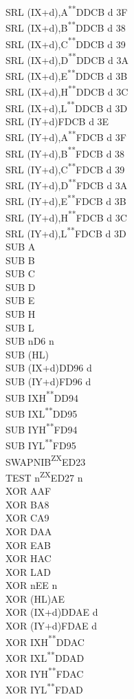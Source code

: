 \documentclass[12pt,twoside,openright,a4paper]{book}
\newcommand{\UNDOC}{\textnormal{\textsuperscript{**}}}
\newcommand{\ZXN}{\textnormal{\textsuperscript{ZX}}}
\begin{document}
\begin{multicols}{3}
{\begin{tabbing}
		SRL (IX+d),A\UNDOC\>DDCB d 3F\\
		SRL (IX+d),B\UNDOC\>DDCB d 38\\
		SRL (IX+d),C\UNDOC\>DDCB d 39\\
		SRL (IX+d),D\UNDOC\>DDCB d 3A\\
		SRL (IX+d),E\UNDOC\>DDCB d 3B\\
		SRL (IX+d),H\UNDOC\>DDCB d 3C\\
		SRL (IX+d),L\UNDOC\>DDCB d 3D\\
		SRL (IY+d)\>FDCB d 3E\\
		SRL (IY+d),A\UNDOC\>FDCB d 3F\\
		SRL (IY+d),B\UNDOC\>FDCB d 38\\
		SRL (IY+d),C\UNDOC\>FDCB d 39\\
		SRL (IY+d),D\UNDOC\>FDCB d 3A\\
		SRL (IY+d),E\UNDOC\>FDCB d 3B\\
		SRL (IY+d),H\UNDOC\>FDCB d 3C\\
		SRL (IY+d),L\UNDOC\>FDCB d 3D\\
		SUB A\\
		SUB B\\
		SUB C\\
		SUB D\\
		SUB E\\
		SUB H\\
		SUB L\\
		SUB n\>D6 n\\
		SUB (HL)\\
		SUB (IX+d)\>DD96 d\\
		SUB (IY+d)\>FD96 d\\
		SUB IXH\UNDOC\>DD94\\
		SUB IXL\UNDOC\>DD95\\
		SUB IYH\UNDOC\>FD94\\
		SUB IYL\UNDOC\>FD95\\
		SWAPNIB\ZXN\>ED23\\
		TEST n\ZXN\>ED27 n\\
		XOR A\>AF\\
		XOR B\>A8\\
		XOR C\>A9\\
		XOR D\>AA\\
		XOR E\>AB\\
		XOR H\>AC\\
		XOR L\>AD\\
		XOR n\>EE n\\
		XOR (HL)\>AE\\
		XOR (IX+d)\>DDAE d\\
		XOR (IY+d)\>FDAE d\\
		XOR IXH\UNDOC\>DDAC\\
		XOR IXL\UNDOC\>DDAD\\
		XOR IYH\UNDOC\>FDAC\\
		XOR IYL\UNDOC\>FDAD

	\end{tabbing}
}
\end{multicols}
\normalsize
\end{document}
